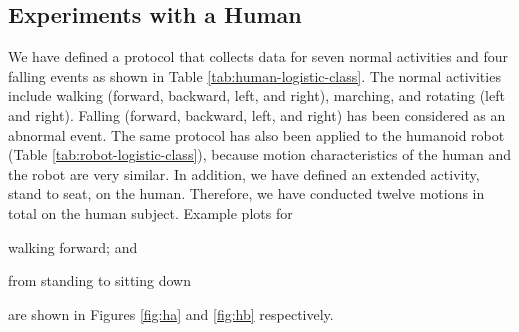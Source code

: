 \documentclass{IEEEtran}
\begin{document}
\subsection{Experiments with a Human}


We have defined a protocol that collects data for seven normal activities and four falling events 
as 
shown in Table \ref{tab:human-logistic-class}. The normal activities include walking 
(forward, backward, left, and right), marching, and rotating (left and right). Falling  (forward, 
backward, left, and right) has been considered as an abnormal event.  The same protocol has also 
been applied to the 
humanoid robot (Table \ref{tab:robot-logistic-class}), because  motion characteristics of the human and the 
robot are very similar. In addition, we 
have  defined an extended activity, stand to seat, on the human. Therefore, we have conducted 
twelve motions in total on the human subject.  Example plots for 
\begin{inparaenum}[($i$)] \item walking forward; and \item from standing to sitting 
down  \end{inparaenum}  are shown in Figures \ref{fig:ha} and \ref{fig:hb} respectively. 
\end{document}
